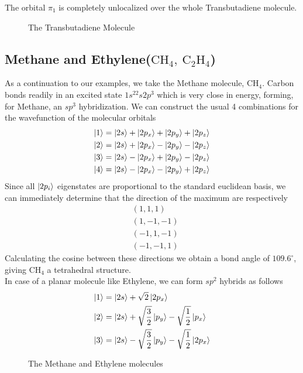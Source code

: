 \documentclass[../qm.tex]{subfiles}
\begin{document}
	The orbital $\pi_1$ is completely unlocalized over the whole Transbutadiene molecule.
	\begin{figure}[H]
		\centering
		\caption{The Transbutadiene Molecule}
		\label{fig:transbutadiene}
	\end{figure}
	\subsection{Methane and Ethylene($\mathrm{CH_4,\ C_2H_4}$)}
	As a continuation to our examples, we take the Methane molecule, $\mathrm{CH_4}$. Carbon bonds readily in an excited state $1s^22s2p^3$ which is very close in energy, forming, for Methane, an $sp^3$ hybridization. We can construct the usual 4 combinations for the wavefunction of the molecular orbitals
	\begin{equation}
		\begin{aligned}
			\ket{1}&=\ket{2s}+\ket{2p_x}+\ket{2p_y}+\ket{2p_z}\\
			\ket{2}&=\ket{2s}+\ket{2p_x}-\ket{2p_y}-\ket{2p_z}\\
			\ket{3}&=\ket{2s}-\ket{2p_x}+\ket{2p_y}-\ket{2p_z}\\
			\ket{4}&=\ket{2s}-\ket{2p_x}-\ket{2p_y}+\ket{2p_z}
		\end{aligned}
		\label{eq:methanewavefunctions}
	\end{equation}
	Since all $\ket{2p_i}$ eigenstates are proportional to the standard euclidean basis, we can immediately determine that the direction of the maximum are respectively
	\begin{equation*}
		\begin{aligned}
			&(1,1,1)\\
			&(1,-1,-1)\\
			&(-1,1,-1)\\
			&(-1,-1,1)
		\end{aligned}
	\end{equation*}
	Calculating the cosine between these directions we obtain a bond angle of $109.6^{\circ}$, giving $\mathrm{CH_4}$ a tetrahedral structure.\\
	In case of a planar molecule like Ethylene, we can form $sp^2$ hybrids as follows
	\begin{equation}
		\begin{aligned}
			\ket{1}&=\ket{2s}+\sqrt{2}\ket{2p_x}\\
			\ket{2}&=\ket{2s}+\sqrt{\frac{3}{2}}\ket{p_y}-\sqrt{\frac{1}{2}}\ket{p_x}\\
			\ket{3}&=\ket{2s}-\sqrt{\frac{3}{2}}\ket{p_y}-\sqrt{\frac{1}{2}}\ket{2p_x}
		\end{aligned}
		\label{eq:ethylene}
	\end{equation}
	\begin{figure}[H]
		\centering
		\qquad\qquad{}
		\label{fig:methaneethylene}
		\caption{The Methane and Ethylene molecules}
	\end{figure}
\end{document}
